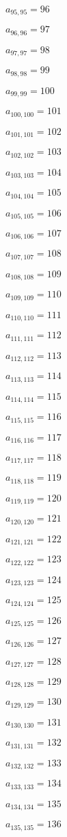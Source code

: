 \documentclass[a4paper,12pt]{article}
\begin{document}
$a _{ 95, 95 } = 96$

$a _{ 96, 96 } = 97$

$a _{ 97, 97 } = 98$

$a _{ 98, 98 } = 99$

$a _{ 99, 99 } = 100$

$a _{ 100, 100 } = 101$

$a _{ 101, 101 } = 102$

$a _{ 102, 102 } = 103$

$a _{ 103, 103 } = 104$

$a _{ 104, 104 } = 105$

$a _{ 105, 105 } = 106$

$a _{ 106, 106 } = 107$

$a _{ 107, 107 } = 108$

$a _{ 108, 108 } = 109$

$a _{ 109, 109 } = 110$

$a _{ 110, 110 } = 111$

$a _{ 111, 111 } = 112$

$a _{ 112, 112 } = 113$

$a _{ 113, 113 } = 114$

$a _{ 114, 114 } = 115$

$a _{ 115, 115 } = 116$

$a _{ 116, 116 } = 117$

$a _{ 117, 117 } = 118$

$a _{ 118, 118 } = 119$

$a _{ 119, 119 } = 120$

$a _{ 120, 120 } = 121$

$a _{ 121, 121 } = 122$

$a _{ 122, 122 } = 123$

$a _{ 123, 123 } = 124$

$a _{ 124, 124 } = 125$

$a _{ 125, 125 } = 126$

$a _{ 126, 126 } = 127$

$a _{ 127, 127 } = 128$

$a _{ 128, 128 } = 129$

$a _{ 129, 129 } = 130$

$a _{ 130, 130 } = 131$

$a _{ 131, 131 } = 132$

$a _{ 132, 132 } = 133$

$a _{ 133, 133 } = 134$

$a _{ 134, 134 } = 135$

$a _{ 135, 135 } = 136$
\end{document}
